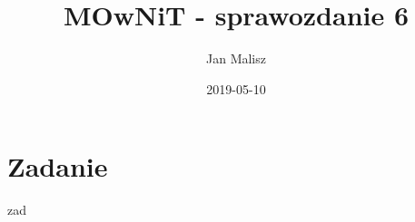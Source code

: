 \documentclass[10pt,a4paper]{article}
\title{MOwNiT - sprawozdanie 6}
\author{Jan Malisz}
\date{2019-05-10}
\begin{document}
  \maketitle
  \thispagestyle{empty}
  \newpage

  \section*{Zadanie}\label{sec:Zadanie}
  {zad}
\end{document}
